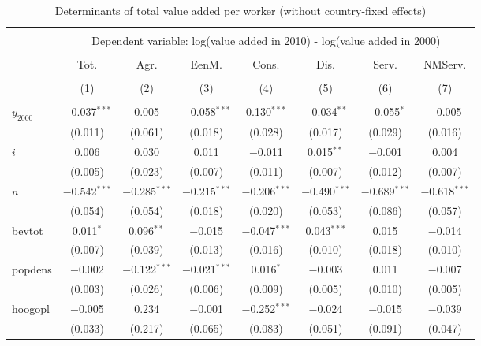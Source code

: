 
\begin{table}[t!] \centering \small
  \caption{Determinants of total value added per worker (without country-fixed effects)} 
  \label{OLStable} 
\begin{tabular}{@{\extracolsep{5pt}}lccccccc} 
\\[-1.8ex]\hline 
\hline \\[-1.8ex] 
 & \multicolumn{7}{c}{Dependent variable: log(value added in 2010) - log(value added in 2000)} \\ 
\cline{2-8} 
\\[-1.8ex] & Tot. & Agr. & EenM. & Cons. & Dis. & Serv. & NMServ. \\ 
\\[-1.8ex] & (1) & (2) & (3) & (4) & (5) & (6) & (7)\\ 
\hline \\[-1.8ex] 
 $y_{2000}$ & $-$0.037$^{***}$ & 0.005 & $-$0.058$^{***}$ & 0.130$^{***}$ & $-$0.034$^{**}$ & $-$0.055$^{*}$ & $-$0.005 \\ 
  & (0.011) & (0.061) & (0.018) & (0.028) & (0.017) & (0.029) & (0.016) \\ 
  $i$ & 0.006 & 0.030 & 0.011 & $-$0.011 & 0.015$^{**}$ & $-$0.001 & 0.004 \\ 
  & (0.005) & (0.023) & (0.007) & (0.011) & (0.007) & (0.012) & (0.007) \\ 
  $n$ & $-$0.542$^{***}$ & $-$0.285$^{***}$ & $-$0.215$^{***}$ & $-$0.206$^{***}$ & $-$0.490$^{***}$ & $-$0.689$^{***}$ & $-$0.618$^{***}$ \\ 
  & (0.054) & (0.054) & (0.018) & (0.020) & (0.053) & (0.086) & (0.057) \\ 
  bevtot & 0.011$^{*}$ & 0.096$^{**}$ & $-$0.015 & $-$0.047$^{***}$ & 0.043$^{***}$ & 0.015 & $-$0.014 \\ 
  & (0.007) & (0.039) & (0.013) & (0.016) & (0.010) & (0.018) & (0.010) \\ 
  popdens & $-$0.002 & $-$0.122$^{***}$ & $-$0.021$^{***}$ & 0.016$^{*}$ & $-$0.003 & 0.011 & $-$0.007 \\ 
  & (0.003) & (0.026) & (0.006) & (0.009) & (0.005) & (0.010) & (0.005) \\ 
  hoogopl & $-$0.005 & 0.234 & $-$0.001 & $-$0.252$^{***}$ & $-$0.024 & $-$0.015 & $-$0.039 \\ 
  & (0.033) & (0.217) & (0.065) & (0.083) & (0.051) & (0.091) & (0.047) \\ 

\end{tabular}
\end{table}
